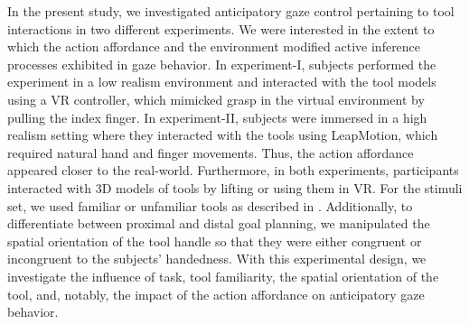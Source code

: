 In the present study, we investigated anticipatory gaze control pertaining to tool interactions in two different experiments. We were interested in the extent to which the action affordance and the environment modified active inference processes exhibited in gaze behavior. In experiment-I, subjects performed the experiment in a low realism environment and interacted with the tool models using a VR controller, which mimicked grasp in the virtual environment by pulling the index finger. In experiment-II, subjects were immersed in a high realism setting where they interacted with the tools using LeapMotion, which required natural hand and finger movements. Thus, the action affordance appeared closer to the real-world. Furthermore, in both experiments, participants interacted with 3D models of tools by lifting or using them in VR. For the stimuli set, we used familiar or unfamiliar tools as described in \citet{Belardinelli2016-xb}. Additionally, to differentiate between proximal and distal goal planning, we manipulated the spatial orientation of the tool handle so that they were either congruent or incongruent to the subjects’ handedness.  With this experimental design, we investigate the influence of task, tool familiarity, the spatial orientation of the tool, and, notably, the impact of the action affordance on anticipatory gaze behavior. 

